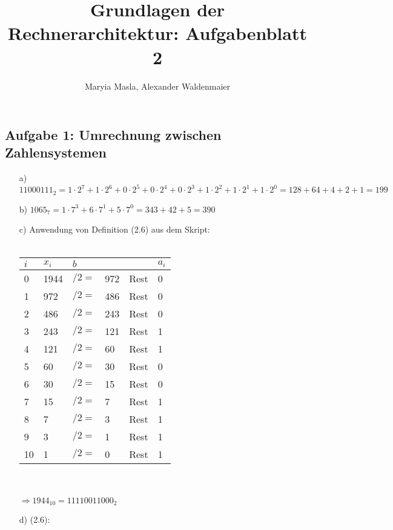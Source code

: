 \documentclass{article}
\title{Grundlagen der Rechnerarchitektur: Aufgabenblatt 2}
\author{Maryia Masla, Alexander Waldenmaier}
\begin{document}
    \maketitle

    \subsection*{Aufgabe 1: Umrechnung zwischen Zahlensystemen}
    \begin{itemize}
        \item[a)] $11000111_2 = 1\cdot 2^7 + 1\cdot 2^6 + 0\cdot 2^5 + 0\cdot 2^4 + 0\cdot 2^3 + 1\cdot 2^2 + 1\cdot 2^1 + 1\cdot 2^0 = 128+64+4+2+1 = 199$
        \item[b)] $1065_7 = 1\cdot 7^3 + 6\cdot 7^1 + 5\cdot 7^0 = 343 + 42 + 5 = 390$
        \item[c)] Anwendung von Definition (2.6) aus dem Skript:\\\\
        \begin{tabular}{llllll}
            $i$ & $x_i$ & $b$       &       &       & $a_i$ \\
            \hline 
            0   & 1944  & $/2 = $   & 972   & Rest  & 0 \\
            1   & 972   & $/2 = $   & 486   & Rest  & 0 \\
            2   & 486   & $/2 = $   & 243   & Rest  & 0 \\
            3   & 243   & $/2 = $   & 121   & Rest  & 1 \\
            4   & 121   & $/2 = $   & 60    & Rest  & 1 \\
            5   & 60    & $/2 = $   & 30    & Rest  & 0 \\
            6   & 30    & $/2 = $   & 15    & Rest  & 0 \\
            7   & 15    & $/2 = $   & 7     & Rest  & 1 \\
            8   & 7     & $/2 = $   & 3     & Rest  & 1 \\
            9   & 3     & $/2 = $   & 1     & Rest  & 1 \\
            10  & 1     & $/2 = $   & 0     & Rest  & 1 
        \end{tabular}\\\\
        $\Rightarrow 1944_{10} = 11110011000_2$
        \item[d)] (2.6):\\\\
        \begin{tabular}{llllll}

\end{tabular}
\end{itemize}
\end{document}
